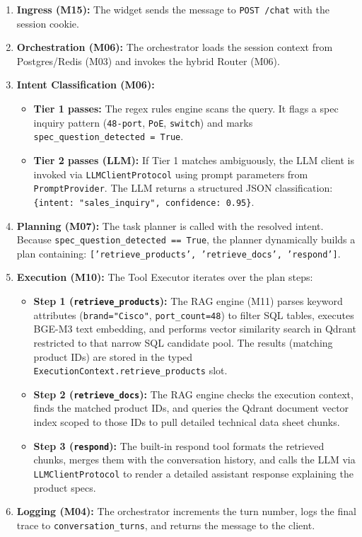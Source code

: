 \documentclass[11pt,a4paper]{article}
\begin{document}
\begin{enumerate}
    \item \textbf{Ingress (M15):} The widget sends the message to \texttt{POST /chat} with the session cookie.
    \item \textbf{Orchestration (M06):} The orchestrator loads the session context from Postgres/Redis (M03) and invokes the hybrid Router (M06).
    \item \textbf{Intent Classification (M06):} 
    \begin{itemize}
        \item \textbf{Tier 1 passes:} The regex rules engine scans the query. It flags a spec inquiry pattern (\texttt{48-port}, \texttt{PoE}, \texttt{switch}) and marks \texttt{spec_question_detected = True}.
        \item \textbf{Tier 2 passes (LLM):} If Tier 1 matches ambiguously, the LLM client is invoked via \texttt{LLMClientProtocol} using prompt parameters from \texttt{PromptProvider}. The LLM returns a structured JSON classification: \texttt{\{intent: "sales_inquiry", confidence: 0.95\}}.
    \end{itemize}
    \item \textbf{Planning (M07):} The task planner is called with the resolved intent. Because \texttt{spec_question_detected == True}, the planner dynamically builds a plan containing:
    \texttt{['retrieve_products', 'retrieve_docs', 'respond']}.
    \item \textbf{Execution (M10):} The Tool Executor iterates over the plan steps:
    \begin{itemize}
        \item \textbf{Step 1 (\texttt{retrieve_products}):} The RAG engine (M11) parses keyword attributes (\texttt{brand="Cisco"}, \texttt{port_count=48}) to filter SQL tables, executes BGE-M3 text embedding, and performs vector similarity search in Qdrant restricted to that narrow SQL candidate pool. The results (matching product IDs) are stored in the typed \texttt{ExecutionContext.retrieve_products} slot.
        \item \textbf{Step 2 (\texttt{retrieve_docs}):} The RAG engine checks the execution context, finds the matched product IDs, and queries the Qdrant document vector index scoped to those IDs to pull detailed technical data sheet chunks.
        \item \textbf{Step 3 (\texttt{respond}):} The built-in respond tool formats the retrieved chunks, merges them with the conversation history, and calls the LLM via \texttt{LLMClientProtocol} to render a detailed assistant response explaining the product specs.
    \end{itemize}
    \item \textbf{Logging (M04):} The orchestrator increments the turn number, logs the final trace to \texttt{conversation_turns}, and returns the message to the client.
\end{enumerate}
\end{document}
